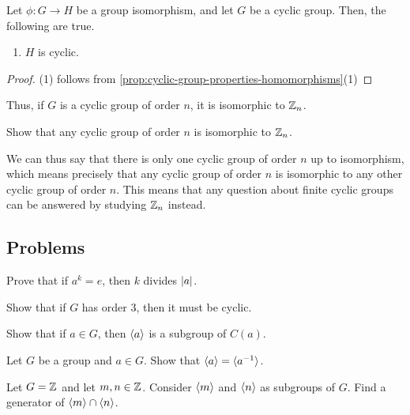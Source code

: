 \documentclass[./algebra-notes.tex]{subfiles}
\begin{document}
\begin{proposition}
    Let $\phi: G \to H$ be a group isomorphism, and let $G$ be a cyclic group.
    Then, the following are true.
    \begin{enumerate}
        \item $H$ is cyclic. 
    \end{enumerate}
\end{proposition}
\begin{proof}
    (1) follows from \cref{prop:cyclic-group-properties-homomorphisms}(1)
\end{proof}
Thus, if $G$ is a cyclic group of order $n$, it is isomorphic to $\mathbb{Z}_n$.
\begin{exercise}
    Show that any cyclic group of order $n$ is isomorphic to $\mathbb{Z}_n$.
\end{exercise}
We can thus say that there is only one cyclic group of order $n$ up to
isomorphism, which means precisely that any cyclic group of order $n$ is
isomorphic to any other cyclic group of order $n$. This means that any question
about finite cyclic groups can be answered by studying $\mathbb{Z}_n$ instead.

\subsection{Problems}

\begin{exercise}
    Prove that if $a^k = e$, then $k$ divides $\abs{a}$.
\end{exercise}

\begin{exercise}
    Show that if $G$ has order 3, then it must be cyclic.
\end{exercise}

\begin{exercise}
    Show that if $a \in G$, then ${ \langle a \rangle }$ is a subgroup of $C(a)$.
\end{exercise}

\begin{exercise}
    Let $G$ be a group and $a \in G$. Show that ${ \langle a \rangle } = { \langle a^{-1} \rangle }$.
\end{exercise}

\begin{exercise}
    Let $G = \mathbb{Z}$ and let $m, n \in \mathbb{Z}$. Consider ${ \langle m \rangle }$ and ${ \langle n \rangle }$ as
    subgroups of $G$. Find a generator of ${ \langle m \rangle } \cap { \langle n \rangle }$.
\end{exercise}
\end{document}
